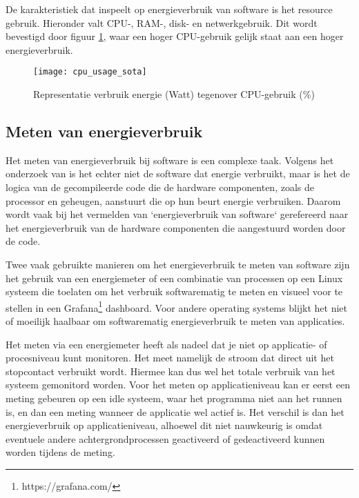 \bigskip

De karakteristiek dat inspeelt op energieverbruik van software is het resource gebruik. Hieronder valt CPU-, RAM-, disk- en netwerkgebruik. Dit wordt bevestigd door figuur \ref{cpu_usage_sota}, waar een hoger CPU-gebruik gelijk staat aan een hoger energieverbruik.\\



\begin{figure}[h!]
    \texttt{[image: cpu\_usage\_sota]}
    \centering
    \caption{Representatie verbruik energie (Watt) tegenover CPU-gebruik (\%) \autocite{Ciancarini2020}}
    \label{cpu_usage_sota}
\end{figure}

\subsection{Meten van energieverbruik}
Het meten van energieverbruik bij software is een complexe taak. Volgens het onderzoek van \autocite{Dutta2023} is het echter niet de software dat energie verbruikt, maar is het de logica van de gecompileerde code die de hardware componenten, zoals de processor en geheugen, aanstuurt die op hun beurt energie verbruiken. Daarom wordt vaak bij het vermelden van `energieverbruik van software` gerefereerd naar het energieverbruik van de hardware componenten die aangestuurd worden door de code.

\bigskip
Twee vaak gebruikte manieren om het energieverbruik te meten van software zijn het gebruik van een energiemeter of een combinatie van processen op een Linux systeem die toelaten om het verbruik softwarematig te meten en visueel voor te stellen in een Grafana\footnote{https://grafana.com/} dashboard. Voor andere operating systems blijkt het niet of moeilijk haalbaar om softwarematig energieverbruik te meten van applicaties. \bigskip

Het meten via een energiemeter heeft als nadeel dat je niet op applicatie- of procesniveau kunt monitoren. Het meet namelijk de stroom dat direct uit het stopcontact verbruikt wordt. Hiermee kan dus wel het totale verbruik van het systeem gemonitord worden. Voor het meten op applicatieniveau kan er eerst een meting gebeuren op een idle systeem, waar het programma niet aan het runnen is, en dan een meting wanneer de applicatie wel actief is. Het verschil is dan het energieverbruik op applicatieniveau, alhoewel dit niet nauwkeurig is omdat eventuele andere achtergrondprocessen geactiveerd of gedeactiveerd kunnen worden tijdens de meting. \bigskip

